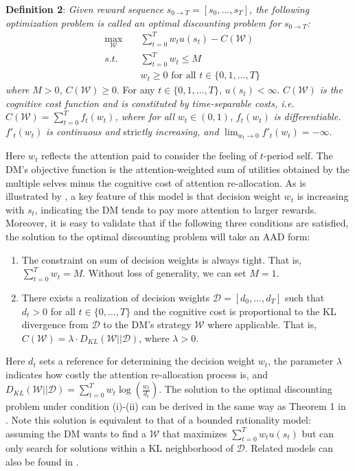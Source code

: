 \documentclass[
  12pt,
]{article}
\begin{document}
\noindent \textbf{Definition 2}: \emph{Given reward sequence}
\(s_{0\rightarrow T}=[s_0,...,s_T]\)\emph{, the following optimization
problem is called an optimal discounting problem for}
\(s_{0\rightarrow T}\)\emph{:}\[
\begin{aligned}
&\max_{\mathcal{W}}\;&&\sum_{t=0}^T w_tu(s_t) - C(\mathcal{W}) \\
&s.t.\; &&\sum_{t=0}^Tw_t \leq M \\
&&& w_t \geq 0 \text{ for all } t\in \{0,1,...,T\}
\end{aligned}
\]\emph{where} \(M>0\)\emph{,} \(C(\mathcal{W})\geq 0\). For any
\(t\in\{0,1,…,T\}\), \(u(s_t)<\infty\). \(C(\mathcal{W})\) \emph{is the
cognitive cost function and is constituted by time-separable costs,
i.e.} \(C(\mathcal{W})=\sum_{t=0}^Tf_t(w_t)\)\emph{, where for all}
\(w_t\in(0,1)\)\emph{,} \(f_t(w_t)\) \emph{is differentiable.}
\(f'_t(w_t)\) \emph{is continuous and} stric\emph{tly increasing, and}
\(\lim_{w_t\rightarrow 0} f'_t(w_t)=-\infty\).

Here \(w_t\) reflects the attention paid to consider the feeling of
\(t\)-period self. The DM's objective function is the attention-weighted
sum of utilities obtained by the multiple selves minus the cognitive
cost of attention re-allocation. As is illustrated by
\citet{noor2022optimal,noor2024constrained}, a key feature of this model
is that decision weight \(w_t\) is increasing with \(s_t\), indicating
the DM tends to pay more attention to larger rewards. Moreover, it is
easy to validate that if the following three conditions are satisfied,
the solution to the optimal discounting problem will take an AAD form:

\begin{enumerate}
\def\labelenumi{(\roman{enumi})}
\item
  The constraint on sum of decision weights is always tight. That is,
  \(\sum_{t=0}^Tw_t=M\). Without loss of generality, we can set \(M=1\).
\item
  There exists a realization of decision weights
  \(\mathcal{D}=[d_0,...,d_T]\) such that \(d_t>0\) for all
  \(t\in\{0,…,T\}\) and the cognitive cost is proportional to the KL
  divergence from \(\mathcal{D}\) to the DM's strategy \(\mathcal{W}\)
  where applicable. That is,
  \(C(\mathcal{W})= \lambda\cdot D_{KL}(\mathcal{W}||\mathcal{D})\),
  where \(\lambda>0\).
\end{enumerate}

Here \(d_t\) sets a reference for determining the decision weight
\(w_t\), the parameter \(\lambda\) indicates how costly the attention
re-allocation process is, and
\(D_{KL}(\mathcal{W}||\mathcal{D})=\sum_{t=0}^Tw_t\log(\frac{w_t}{d_t})\).
The solution to the optimal discounting problem under condition (i)-(ii)
can be derived in the same way as Theorem 1 in
\citet{matvejka2015rational}. Note this solution is equivalent to that
of a bounded rationality model: assuming the DM wants to find a
\(\mathcal{W}\) that maximizes \(\sum_{t=0}^Tw_tu(s_t)\) but can only
search for solutions within a KL neighborhood of \(\mathcal{D}\).
Related models can also be found in \citet{todorov2009efficient}.
\end{document}
